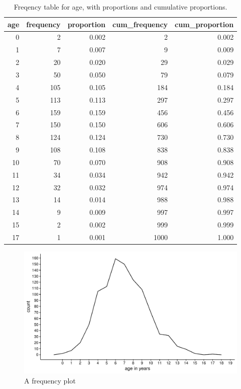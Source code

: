 \documentclass[]{book}\usepackage[]{graphicx}\usepackage[]{color}
\makeatletter
\def\maxwidth{ %
  \ifdim\Gin@nat@width>\linewidth
    \linewidth
  \else
    \Gin@nat@width
  \fi
}
\newenvironment{knitrout}{}{} %
\makeatother
\begin{document}
\begin{table}[ht]
\centering
\caption{Freqency table for age, with proportions and cumulative proportions.} 
\label{tab:frequency_1}
\begin{tabular}{rrrrr}
  \hline
age & frequency & proportion & cum\_frequency & cum\_proportion \\ 
  \hline
   0 &    2 & 0.002 &    2 & 0.002 \\ 
     1 &    7 & 0.007 &    9 & 0.009 \\ 
     2 &   20 & 0.020 &   29 & 0.029 \\ 
     3 &   50 & 0.050 &   79 & 0.079 \\ 
     4 &  105 & 0.105 &  184 & 0.184 \\ 
     5 &  113 & 0.113 &  297 & 0.297 \\ 
     6 &  159 & 0.159 &  456 & 0.456 \\ 
     7 &  150 & 0.150 &  606 & 0.606 \\ 
     8 &  124 & 0.124 &  730 & 0.730 \\ 
     9 &  108 & 0.108 &  838 & 0.838 \\ 
    10 &   70 & 0.070 &  908 & 0.908 \\ 
    11 &   34 & 0.034 &  942 & 0.942 \\ 
    12 &   32 & 0.032 &  974 & 0.974 \\ 
    13 &   14 & 0.014 &  988 & 0.988 \\ 
    14 &    9 & 0.009 &  997 & 0.997 \\ 
    15 &    2 & 0.002 &  999 & 0.999 \\ 
    17 &    1 & 0.001 & 1000 & 1.000 \\ 
   \hline
\end{tabular}
\end{table}


\begin{knitrout}
\color{fgcolor}\begin{figure}

{\centering \includegraphics[width=\maxwidth]{figure/distr_1-1} 

}

\caption[A frequency plot]{A frequency plot}\label{fig:distr_1}
\end{figure}


\end{knitrout}
\end{document}
